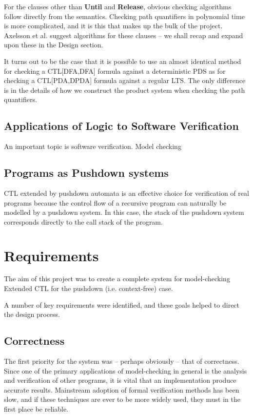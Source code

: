 \documentclass[11pt]{article}
\theoremstyle{definition}
\begin{document}
For the clauses other than \textbf{Until} and \textbf{Release}, obvious
checking algorithms follow directly from the semantics.  Checking path
quantifiers in polynomial time is more complicated, and it is this that makes
up the bulk of the project.  Axelsson et al. suggest algorithms for these
clauses\cite{Kreutzer10} -- we shall recap and expand upon these in the Design
section.

It turns out to be the case that it is possible to use an almost identical
method for checking a CTL[DFA,DFA] formula against a deterministic PDS as for
checking a CTL[PDA,DPDA] formula against a regular LTS. The only difference is
in the details of how we construct the product system when checking the path
quantifiers.

\subsection{Applications of Logic to Software Verification}

An important topic 
is software verification.
Model checking



\subsection{Programs as Pushdown systems}

CTL extended by pushdown automata is an effective choice for verification of
real programs because the control flow of a recursive program can naturally be
modelled by a pushdown system. In this case, the stack of the pushdown system
corresponds directly to the call stack of the program.



\section{Requirements}

The aim of this project was to create a complete system for model-checking
Extended CTL for the pushdown (i.e. context-free) case. 

A number of key requirements were identified, and these goals helped to direct
the design process. 

\subsection{Correctness}

The first priority for the system was -- perhaps obviously -- that of
correctness. Since one of the primary applications of model-checking in general
is the analysis and verification of other programs, it is vital that an
implementation produce accurate results. Mainstream adoption of formal
verification methods has been slow\cite{mitra2008strategies}, and if these
techniques are ever to be more widely used, they must in the first place be
reliable.
\end{document}
